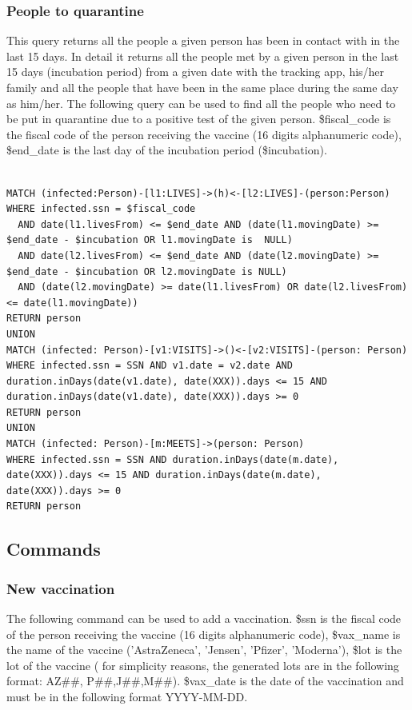 \documentclass{article}
\begin{document}
\subsubsection{People to quarantine}
This query returns all the people a given person has been in contact with in the last 15 days. In detail it returns all the people met by a given person in the last 15 days (incubation period) from a given date with the tracking app, his/her family and all the people that have been in the same place during the same day as him/her.
The following query can be used to find all the people who need to be put in quarantine due to a positive test of the given person.
\$fiscal\_code is the fiscal code of the person receiving the vaccine (16 digits alphanumeric code), \$end\_date is the last day of the incubation period (\$incubation).

\begin{lstlisting}[language=cypher, label=lst:cypher-example]

MATCH (infected:Person)-[l1:LIVES]->(h)<-[l2:LIVES]-(person:Person)
WHERE infected.ssn = $fiscal_code
  AND date(l1.livesFrom) <= $end_date AND (date(l1.movingDate) >= $end_date - $incubation OR l1.movingDate is  NULL)
  AND date(l2.livesFrom) <= $end_date AND (date(l2.movingDate) >= $end_date - $incubation OR l2.movingDate is NULL)
  AND (date(l2.movingDate) >= date(l1.livesFrom) OR date(l2.livesFrom) <= date(l1.movingDate))
RETURN person
UNION
MATCH (infected: Person)-[v1:VISITS]->()<-[v2:VISITS]-(person: Person)
WHERE infected.ssn = SSN AND v1.date = v2.date AND duration.inDays(date(v1.date), date(XXX)).days <= 15 AND duration.inDays(date(v1.date), date(XXX)).days >= 0
RETURN person
UNION
MATCH (infected: Person)-[m:MEETS]->(person: Person)
WHERE infected.ssn = SSN AND duration.inDays(date(m.date), date(XXX)).days <= 15 AND duration.inDays(date(m.date), date(XXX)).days >= 0
RETURN person
\end{lstlisting}

\subsection{Commands}
\subsubsection{New vaccination}
The following command can be used to add a vaccination. \$ssn is the fiscal code of the person receiving the vaccine (16 digits alphanumeric code), \$vax\_name is the name of the vaccine ('AstraZeneca', 'Jensen', 'Pfizer', 'Moderna'), \$lot is the lot of the vaccine (
for simplicity reasons, the generated lots are in the following format: AZ\#\#, P\#\#,J\#\#,M\#\#). \$vax\_date is the date of the vaccination and must be in the following format YYYY-MM-DD.
\end{document}
